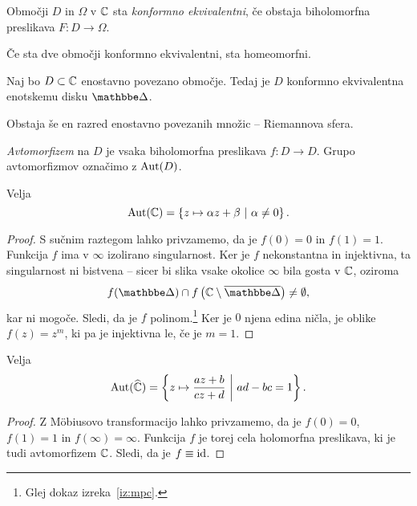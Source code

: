 \begin{definicija}
Območji $D$ in $\Omega$ v $\mathbb{C}$ sta
\emph{konformno ekvivalentni},
če obstaja biholomorfna preslikava $F \colon D \to \Omega$.
\end{definicija}

\begin{opomba}
Če sta dve območji konformno ekvivalentni, sta homeomorfni.
\end{opomba}


\begin{izrek}[Riemann]
Naj bo $D \subset \mathbb{C}$ enostavno povezano območje. Tedaj je $D$
konformno ekvivalentna enotskemu disku $\dsk$.
\end{izrek}

\begin{opomba}
Obstaja še en razred enostavno povezanih množic -- Riemannova
sfera.
\end{opomba}

\begin{definicija}
\emph{Avtomorfizem} na $D$ je vsaka
biholomorfna preslikava $f \colon D \to D$. Grupo avtomorfizmov
označimo z $\operatorname{Aut}(D)$.
\end{definicija}

\begin{trditev}
Velja
\[
\operatorname{Aut}(\mathbb{C}) = \left\{z \mapsto \alpha z + \beta~\middle\vert~\alpha \ne 0\right\}.
\]
\end{trditev}

\begin{proof}
S sučnim raztegom lahko privzamemo, da je $f(0) = 0$ in $f(1) = 1$.
Funkcija $f$ ima v $\infty$ izolirano singularnost. Ker je $f$
nekonstantna in injektivna, ta singularnost ni bistvena -- sicer
bi slika vsake okolice $\infty$ bila gosta v $\mathbb{C}$, oziroma
\[
f(\dsk) \cap f\left(\C \setminus \oline{\dsk}\right) \ne \emptyset,
\]
kar ni mogoče. Sledi, da je $f$ polinom.\footnote{Glej dokaz
izreka~\ref{iz:mpc}.} Ker je $0$ njena edina ničla, je oblike
$f(z) = z^m$, ki pa je injektivna le, če je $m = 1$.
\end{proof}

\begin{trditev}
Velja
\[
\operatorname{Aut}(\widehat{\mathbb{C}}) =
\left\{z \mapsto \frac{az + b}{cz + d}~\middle\vert~ad - bc = 1\right\}.
\]
\end{trditev}

\begin{proof}
Z Möbiusovo transformacijo lahko privzamemo, da je $f(0) = 0$,
$f(1) = 1$ in $f(\infty) = \infty$. Funkcija $f$ je torej cela
holomorfna preslikava, ki je tudi avtomorfizem $\mathbb{C}$. Sledi, da je
$f \equiv \operatorname{id}$.
\end{proof}

